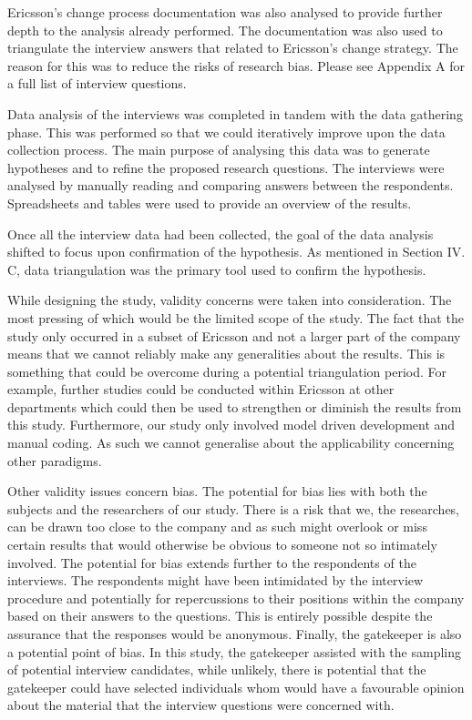 \documentclass[10pt,twocolumn]{article}
\begin{document}
Ericsson's change process documentation was also analysed to provide further depth to the analysis already performed. The documentation was also used to triangulate the interview answers that related to Ericsson's change strategy. The reason for this was to reduce the risks of research bias. Please see Appendix A for a full list of interview questions.

Data analysis of the interviews was completed in tandem with the data gathering phase. This was performed so that we could iteratively improve upon the data collection process. The main purpose of analysing this data was to generate hypotheses and to refine the proposed research questions. The interviews were analysed by manually reading and comparing answers between the respondents. Spreadsheets and tables were used to provide an overview of the results.

Once all the interview data had been collected, the goal of the data analysis shifted to focus upon confirmation of the hypothesis. As mentioned in Section IV. C, data triangulation was the primary tool used to confirm the hypothesis. 


While designing the study, validity concerns were taken into consideration. The most pressing of which would be the limited scope of the study. The fact that the study only occurred in a subset of Ericsson and not a larger part of the company means that we cannot reliably make any generalities about the results. This is something that could be overcome during a potential triangulation period. For example, further studies could be conducted within Ericsson at other departments which could then be used to strengthen or diminish the results from this study. Furthermore, our study only involved model driven development and manual coding. As such we cannot generalise about the applicability concerning other paradigms.

Other validity issues concern bias. The potential for bias lies with both the subjects and the researchers of our study. There is a risk that we, the researches, can be drawn too close to the company and as such might overlook or miss certain results that would otherwise be obvious to someone not so intimately involved. The potential for bias extends further to the respondents of the interviews. The respondents might have been intimidated by the interview procedure and potentially for repercussions to their positions within the company based on their answers to the questions. This is entirely possible despite the assurance that the responses would be anonymous. Finally, the gatekeeper is also a potential point of bias. In this study, the gatekeeper assisted with the sampling of potential interview candidates, while unlikely, there is potential that the gatekeeper could have selected individuals whom would have a favourable opinion about the material that the interview questions were concerned with.
\end{document}
